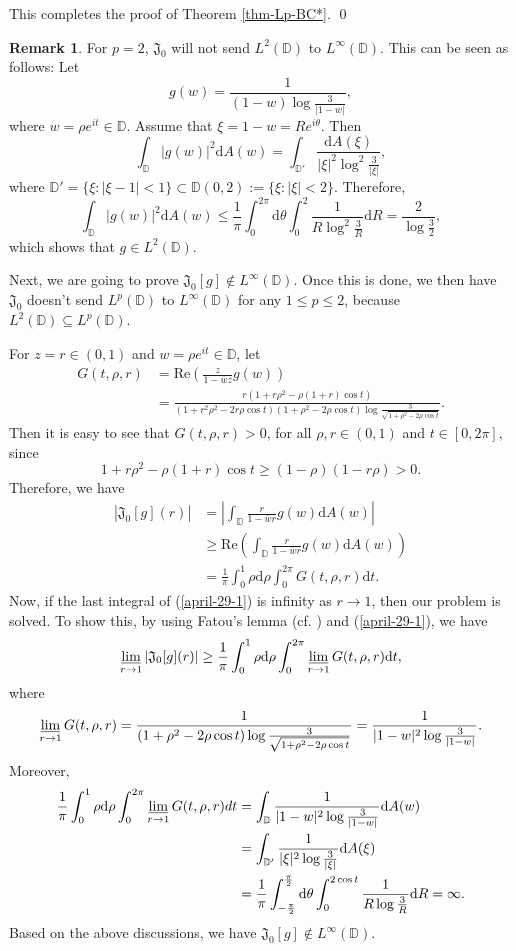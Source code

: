\documentclass[a4paper,12pt]{amsart}
\theoremstyle{definition}
\newtheorem{rem}{Remark}[section]%
\numberwithin{equation}{section}
\newcommand{\ID}{{\mathbb D}}
\begin{document}
This completes the proof of Theorem \ref{thm-Lp-BC*}. \qed
\begin{rem}\label{Remark-3.2-July}
For $p=2$, $\mathfrak{J}_0$ will not send $L^2(\ID)$ to $L^{\infty}(\ID)$. This can be seen as follows:
Let
$$g(w)=\frac{1}{(1-w)\log\frac{3}{|1-w|}},$$
where $w=\rho e^{it}\in\ID$.
Assume that $\xi=1-w=Re^{i\theta}$. Then
$$\int_{\ID}|g(w)|^2\mathrm{d}A(w) =\int_{\ID'}\frac{\mathrm{d}A(\xi)}{|\xi|^2\log^2\frac{3}{|\xi|}},$$
where $\ID'=\{\xi:|\xi-1|<1\}\subset \ID(0, 2):=\{\xi: |\xi|<2\}$. Therefore,
$$\int_{\ID}|g(w)|^2\mathrm{d}A(w) \leq\frac{1}{\pi}\int_0^{2\pi}\mathrm{d}\theta\int_0^2\frac{1}{R\log^2\frac{3}{R}}\mathrm{d}R=\frac{2}{\log\frac{3}{2}},$$
which shows that $g\in L^2(\ID)$.

Next, we are going to prove $\mathfrak{J}_0[g]\notin L^{\infty}(\ID)$. Once this is done, we then have $\mathfrak{J}_0$ doesn't send $L^p(\ID)$ to $L^{\infty}(\ID)$ for any $1\leq p\leq2$, because $L^2(\ID)\subseteq L^p(\ID)$.

For $z=r\in (0, 1)$ and $w=\rho e^{it}\in\ID$,
let
\begin{align*}
  G(t, \rho, r) & = \text{Re}\left(\frac{z}{1-\bar{w}z}g(w)\right)\\
  & =\frac{r (1+r \rho^2-\rho(1+r)\cos t)}{(1+r^2 \rho^2-2 r \rho \cos t) (1+\rho^2-2 \rho \cos t)  \log\frac{3}{\sqrt{1+\rho^2-2 \rho \cos t}}}.
\end{align*}
Then it is easy to see that $ G(t, \rho, r)>0$, for all $\rho, r\in(0, 1)$ and $t\in[0, 2\pi]$, since
$$1+r \rho^2-\rho(1+r)\cos t\geq (1-\rho)(1-r\rho)>0.$$
Therefore, we have
\begin{align}\label{april-29-1}
\nonumber|\mathfrak{J}_0[g](r)| & =\left|\int_{\ID}\frac{r}{1-\bar{w}r}g(w)\mathrm{d}A(w) \right| \\\nonumber
  & \geq \text{Re}\left(\int_{\ID}\frac{r}{1-\bar{w}r}g(w)\mathrm{d}A(w) \right)\\
  &=\frac{1}{\pi}\int_0^1\rho \mathrm{d}\rho\int_0^{2\pi}G(t, \rho, r)\mathrm{d}t.
\end{align}
Now, if the last integral of (\ref{april-29-1}) is infinity as $r\to 1$, then our problem is solved. To show this, by using Fatou's lemma (cf. \cite[Page 23]{Rudin}) and (\ref{april-29-1}), we have
$$  \varliminf_{r\to 1}  |\mathfrak{J}_0[g](r)|\ge \frac{1}{\pi}\int_{0}^1\rho \mathrm{d}\rho\int_0^{2\pi} \varliminf_{r\to 1} G(t,\rho,r) \mathrm{d}t, $$
where
$$\varliminf_{r\to 1}G(t,\rho,r)=\frac{1}{(1+\rho^2-2 \rho \cos t)\log\frac{3}{\sqrt{1+\rho^2-2 \rho \cos t}}}=\frac{1}{|1-w|^2\log\frac{3}{|1-w|}}.$$
Moreover,
\begin{align*}
  \frac{1}{\pi}\int_{0}^1\rho \mathrm{d}\rho\int_0^{2\pi} \varliminf_{r\to 1} G(t,\rho,r) dt& =\int_{\ID}\frac{1}{|1-w|^2\log\frac{3}{|1-w|}}\mathrm{d}A(w)  \\
  &= \int_{\ID'}\frac{1}{|\xi|^2\log\frac{3}{|\xi|}}\mathrm{d}A(\xi)\\
  &= \frac{1}{\pi}\int_{-\frac{\pi}{2}}^{\frac{\pi}{2}} \mathrm{d}\theta\int_0^{2\cos t} \frac{1}{R\log\frac{3}{R}}\mathrm{d}R=\infty.
\end{align*}
Based on the above discussions, we have $\mathfrak{J}_0[g]\notin L^{\infty}(\ID)$.
\end{rem}
\end{document}

